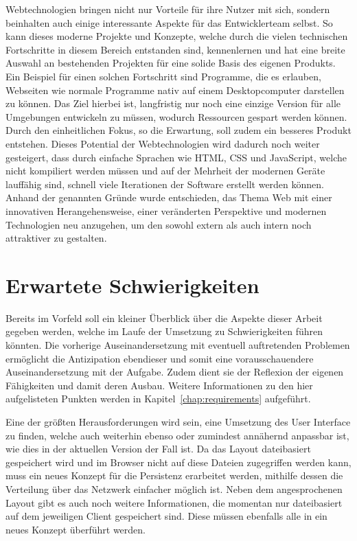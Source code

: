 Webtechnologien bringen nicht nur Vorteile für ihre Nutzer mit sich, sondern beinhalten auch einige interessante Aspekte für das Entwicklerteam selbst. So kann dieses moderne Projekte und Konzepte, welche durch die vielen technischen Fortschritte in diesem Bereich entstanden sind, kennenlernen und hat eine breite Auswahl an bestehenden Projekten für eine solide Basis des eigenen Produkts. Ein Beispiel für einen solchen Fortschritt sind Programme, die es erlauben, Webseiten wie normale Programme nativ auf einem Desktopcomputer darstellen zu können. Das Ziel hierbei ist, langfristig nur noch eine einzige Version für alle Umgebungen entwickeln zu müssen, wodurch Ressourcen gespart werden können. Durch den einheitlichen Fokus, so die Erwartung, soll zudem ein besseres Produkt entstehen. Dieses Potential der Webtechnologien wird dadurch noch weiter gesteigert, dass durch einfache Sprachen wie HTML, CSS und JavaScript, welche nicht kompiliert werden müssen und auf der Mehrheit der modernen Geräte lauffähig sind, schnell viele Iterationen der Software erstellt werden können.
Anhand der genannten Gründe wurde entschieden, das Thema Web mit einer innovativen Herangehensweise, einer veränderten Perspektive und modernen Technologien neu anzugehen, um den  sowohl extern als auch intern noch attraktiver zu gestalten.

\section{Erwartete Schwierigkeiten}
Bereits im Vorfeld soll ein kleiner Überblick über die Aspekte dieser Arbeit gegeben werden, welche im Laufe der Umsetzung zu Schwierigkeiten führen könnten. Die vorherige Auseinandersetzung mit eventuell auftretenden Problemen ermöglicht die Antizipation ebendieser und somit eine vorausschauendere Auseinandersetzung mit der Aufgabe. Zudem dient sie der Reflexion der eigenen Fähigkeiten und damit deren Ausbau. Weitere Informationen zu den hier aufgelisteten Punkten werden in Kapitel~\ref{chap:requirements} aufgeführt.

Eine der größten Herausforderungen wird sein, eine Umsetzung des User Interface zu finden, welche auch weiterhin ebenso oder zumindest annähernd anpassbar ist, wie dies in der aktuellen Version der Fall ist. Da das Layout dateibasiert gespeichert wird und im Browser nicht auf diese Dateien zugegriffen werden kann, muss ein neues Konzept für die Persistenz erarbeitet werden, mithilfe dessen die Verteilung über das Netzwerk einfacher möglich ist. 
Neben dem angesprochenen Layout gibt es auch noch weitere Informationen, die momentan nur dateibasiert auf dem jeweiligen Client gespeichert sind. Diese müssen ebenfalls alle in ein neues Konzept überführt werden.

